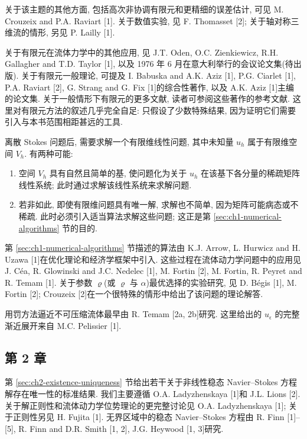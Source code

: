 \hypertarget{comments-page-397}{}
关于该主题的其他方面, 包括高次非协调有限元和更精细的误差估计, 可见 M. Crouzeix and P.A. Raviart [1]. 关于数值实验, 见 F. Thomasset [2]; 关于轴对称三维流的情形, 另见 P. Lailly [1].

关于有限元在流体力学中的其他应用, 见 J.T. Oden, O.C. Zienkiewicz, R.H. Gallagher and T.D. Taylor [1], 以及 1976 年 6 月在意大利举行的会议论文集(待出版). 关于有限元一般理论, 可提及 I. Babuska and A.K. Aziz [1], P.G. Ciarlet [1], P.A. Raviart [2], G. Strang and G. Fix [1]的综合性著作, 以及 A.K. Aziz [1]主编的论文集. 关于一般情形下有限元的更多文献, 读者可参阅这些著作的参考文献. 这里对有限元方法的叙述几乎完全自足: 只假设了少数特殊结果, 因为证明它们需要引入与本书范围相距甚远的工具.

离散 Stokes 问题后, 需要求解一个有限维线性问题, 其中未知量 $u_h$ 属于有限维空间 $V_h$. 有两种可能:
\begin{enumerate}
\item[(a)] 空间 $V_h$ 具有自然且简单的基, 使问题化为关于 $u_h$ 在该基下各分量的稀疏矩阵线性系统; 此时通过求解该线性系统来求解问题.
\item[(b)] 若非如此, 即使有限维问题具有唯一解, 求解也不简单, 因为矩阵可能病态或不稀疏. 此时必须引入适当算法求解这些问题; 这正是第 \ref{sec:ch1-numerical-algorithms} 节的目的.
\end{enumerate}

第 \ref{sec:ch1-numerical-algorithms} 节描述的算法由 K.J. Arrow, L. Hurwicz and H. Uzawa [1]在优化理论和经济学框架中引入. 这些过程在流体动力学问题中的应用见 J. Céa, R. Glowinski and J.C. Nedelec [1], M. Fortin [2], M. Fortin, R. Peyret and R. Temam [1]. 关于参数 $\varrho$(或 $\varrho$ 与 $\alpha$)最优选择的实验研究, 见 D. Bégis [1], M. Fortin [2]; Crouzeix [2]在一个很特殊的情形中给出了该问题的理论解答.

用罚方法逼近不可压缩流体最早由 R. Temam [2a, 2b]研究. 这里给出的 $u_\epsilon$ 的完整渐近展开来自 M.C. Pelissier [1].

\subsection*{第 2 章}

第 \ref{sec:ch2-existence-uniqueness} 节给出若干关于非线性稳态 Navier--Stokes 方程解存在唯一性的标准结果. 我们主要遵循 O.A. Ladyzhenskaya [1]和 J.L. Lions [2]. 关于解正则性和流体动力学位势理论的更完整讨论见 O.A. Ladyzhenskaya [1]; 关于正则性另见 H. Fujita [1]. 无界区域中的稳态 Navier--Stokes 方程由 R. Finn [1]--[5], R. Finn and D.R. Smith [1, 2], J.G. Heywood [1, 3]研究.

